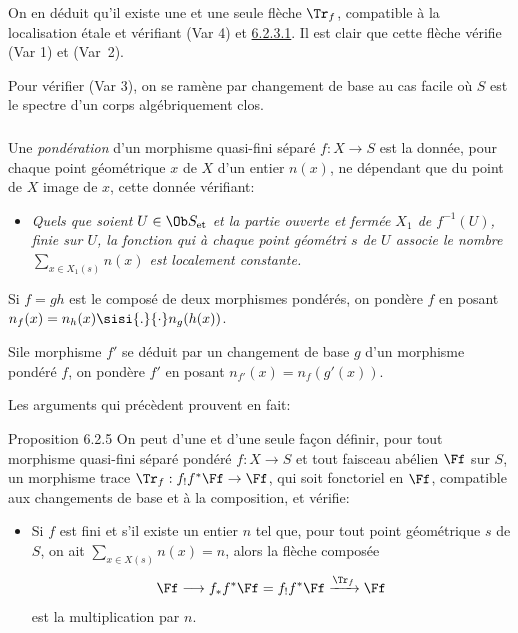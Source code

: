 \documentclass[10pt]{../fichiers-configuration-latex/smfart}
\begin{document}
On en déduit qu'il existe une et une seule flèche $\Tr_{f}$, compatible
à la localisation étale et vérifiant (Var 4) et \hyperref[XVII.lem6.2.3.1]{6.2.3.1}. Il est clair
que cette flèche vérifie (Var 1) et (Var~2).

Pour vérifier (Var 3), on se ramène par changement de base au cas
facile où $S$ est le spectre d'un corps algébriquement clos.

\setcounter{subsubsection}{3}
\subsubsection{}
Une \emph{pondération} d'un morphisme quasi-fini séparé
$f:X\rightarrow S$ est la donnée, pour chaque point géométrique $x$ de
$X$ d'un entier $n(x)$, ne dépendant que du point de $X$ image de $x$,
cette donnée vérifiant:
\begin{itemize}
\item[$(\ast)$] \emph{Quels que soient $U\in \Ob S_{\text{\rm et}}$ et
la partie ouverte et fermée $X_{1}$ de $f^{-1}(U)$, finie sur $U$, la
fonction qui à chaque point géométri $s$ de $U$ associe le nombre
$\sum_{x\in X_{1}(s)}n(x)$ est localement constante.}
\end{itemize}

Si $f=gh$ est le composé de deux morphismes pondérés, on pondère $f$
en posant $n_{f}(x)=n_{h}(x)\sisi{.}{\cdot}n_{g}(h(x))$.

Si\pageoriginale le morphisme $f'$ se déduit par un changement de base
$g$ d'un morphisme pondéré $f$, on pondère $f'$ en posant
$n_{f'}(x)=n_{f}(g'(x))$.

Les arguments qui précèdent prouvent en fait:

\begin{enonce*}{Proposition 6.2.5}
On peut d'une et d'une seule façon définir, pour tout morphisme
quasi-fini séparé pondéré $f:X\rightarrow S$ et tout faisceau abélien
$\Ff $ sur $S$, un morphisme trace
$\Tr_{f}:f_{!}f^{\ast}\Ff \rightarrow \Ff $, qui soit
fonctoriel en $\Ff $, compatible aux changements de base et à
la composition, et vérifie:
\begin{itemize}
\item[\textsuperscript{(Var $\sisi{\leftexp{\prime}{4}}{4'}$)}] Si $f$ est fini et s'il existe un entier $n$ tel
que, pour tout point géométrique $s$ de $S$, on ait $\sum_{x\in
X(s)}n(x)=n$, alors la flèche composée
$$
\Ff \longrightarrow
f_{\ast}f^{\ast}\Ff =f_{!}f^{\ast}\Ff \xrightarrow{\Tr_{f}}\Ff
$$
est la multiplication par $n$.
\end{itemize}
\end{enonce*}
\end{document}
